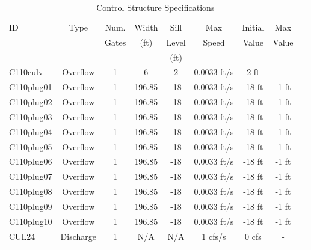 \scriptsize
\begin{table}[h]
\caption{Control Structure Specifications}
\label{tab:struc-specs1}
\begin{tabular}{@{}lcccccccc@{}}
\toprule
{ID}            & {Type}        & Num.     & Width       & Sill         & Max             & Initial         & Max       \\
                &               & Gates    & (ft)        & Level        & Speed           & Value           & Value     \\
                &               &          &             & (ft)         &                 &                 &           \\
\hline
{C110culv}      & Overflow      & 1        & 6           & 2            & 0.0033 ft/s     & 2 ft            & -            \\
{C110plug01}    & Overflow      & 1        & 196.85      & -18          & 0.0033 ft/s     & -18 ft          & -1 ft           \\
{C110plug02}    & Overflow      & 1        & 196.85      & -18          & 0.0033 ft/s     & -18 ft          & -1 ft           \\
{C110plug03}    & Overflow      & 1        & 196.85      & -18          & 0.0033 ft/s     & -18 ft          & -1 ft           \\
{C110plug04}    & Overflow      & 1        & 196.85      & -18          & 0.0033 ft/s     & -18 ft          & -1 ft           \\
{C110plug05}    & Overflow      & 1        & 196.85      & -18          & 0.0033 ft/s     & -18 ft          & -1 ft           \\
{C110plug06}    & Overflow      & 1        & 196.85      & -18          & 0.0033 ft/s     & -18 ft          & -1 ft           \\
{C110plug07}    & Overflow      & 1        & 196.85      & -18          & 0.0033 ft/s     & -18 ft          & -1 ft           \\
{C110plug08}    & Overflow      & 1        & 196.85      & -18          & 0.0033 ft/s     & -18 ft          & -1 ft           \\
{C110plug09}    & Overflow      & 1        & 196.85      & -18          & 0.0033 ft/s     & -18 ft          & -1 ft           \\
{C110plug10}    & Overflow      & 1        & 196.85      & -18          & 0.0033 ft/s     & -18 ft          & -1 ft           \\
{CUL24}         & Discharge     & 1        & N/A         & N/A          & 1 cfs/s         & 0 cfs           & -            \\

\end{tabular}
\end{table}
